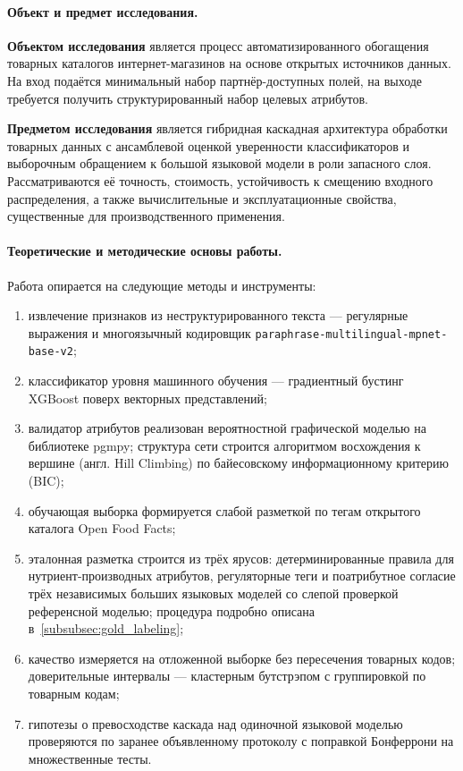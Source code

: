 \paragraph*{Объект и предмет исследования.}

\textbf{Объектом исследования} является процесс автоматизированного обогащения товарных каталогов интернет-магазинов на основе открытых источников данных. На вход подаётся минимальный набор партнёр-доступных полей, на выходе требуется получить структурированный набор целевых атрибутов.

\textbf{Предметом исследования} является гибридная каскадная архитектура обработки товарных данных с ансамблевой оценкой уверенности классификаторов и выборочным обращением к большой языковой модели в роли запасного слоя. Рассматриваются её точность, стоимость, устойчивость к смещению входного распределения, а также вычислительные и эксплуатационные свойства, существенные для производственного применения.

\paragraph*{Теоретические и методические основы работы.}

Работа опирается на следующие методы и инструменты:

\begin{enumerate}[label=\arabic*),leftmargin=*]
    \item извлечение признаков из неструктурированного текста --- регулярные выражения и многоязычный кодировщик \texttt{paraphrase-\allowbreak multilingual-\allowbreak mpnet-\allowbreak base-v2};
    \item классификатор уровня машинного обучения --- градиентный бустинг XGBoost поверх векторных представлений;
    \item валидатор атрибутов реализован вероятностной графической моделью на библиотеке pgmpy; структура сети строится алгоритмом восхождения к вершине (англ. Hill Climbing) по байесовскому информационному критерию (BIC);
    \item обучающая выборка формируется слабой разметкой по тегам открытого каталога Open Food Facts;
    \item эталонная разметка строится из трёх ярусов: детерминированные правила для нутриент-производных атрибутов, регуляторные теги и поатрибутное согласие трёх независимых больших языковых моделей со слепой проверкой референсной моделью; процедура подробно описана в~\ref{subsubsec:gold_labeling};
    \item качество измеряется на отложенной выборке без пересечения товарных кодов; доверительные интервалы --- кластерным бутстрэпом с группировкой по товарным кодам;
    \item гипотезы о превосходстве каскада над одиночной языковой моделью проверяются по заранее объявленному протоколу с поправкой Бонферрони на множественные тесты.
\end{enumerate}

